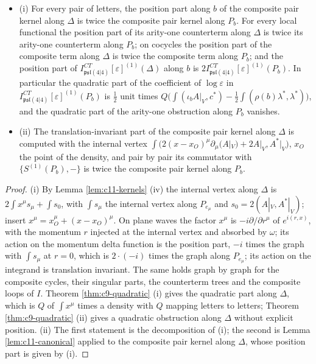 \begin{proposition}
\label{prop:c11-position}
\begin{itemize}
\item (i) For every pair of letters, the position part along $b$ of the composite pair kernel along $\Delta$ is twice the composite pair kernel along $P_b$. For every local functional the position part of its arity-one counterterm along $\Delta$ is twice its arity-one counterterm along $P_b$; on cocycles the position part of the composite term along $\Delta$ is twice the composite term along $P_b$; and the position part of $I^{CT}_{\mathfrak{psl}(4|4)}[\varepsilon]^{(1)}(\Delta)$ along $b$ is $2I^{CT}_{\mathfrak{psl}(4|4)}[\varepsilon]^{(1)}(P_b)$. In particular the quadratic part of the coefficient of $\log\varepsilon$ in $I^{CT}_{\mathfrak{psl}(4|4)}[\varepsilon]^{(1)}(P_b)$ is $\tfrac12$ unit times $Q\big(\int(\iota_bA|_V,c^*)-\tfrac12\int(\rho(b)\lambda^*,\lambda^*)\big)$, and the quadratic part of the arity-one obstruction along $P_b$ vanishes.
\item (ii) The translation-invariant part of the composite pair kernel along $\Delta$ is computed with the internal vertex $\int\big(2(x-x_O)^\mu\partial_\mu(A|_V)+2A|_V,A^*|_V\big)$, $x_O$ the point of the density, and pair by pair its commutator with $\{S^{(1)}(P_b),-\}$ is twice the composite pair kernel along $P_b$.
\end{itemize}
\end{proposition}

\begin{proof}
(i) By Lemma \ref{lem:c11-kernels} (iv) the internal vertex along $\Delta$ is $2\int x^\mu s_\mu+\int s_0$, with $\int s_\mu$ the internal vertex along $P_{e_\mu}$ and $s_0=2(A|_V,A^*|_V)$; insert $x^\mu=x_O^\mu+(x-x_O)^\mu$. On plane waves the factor $x^\mu$ is $-i\partial/\partial r^\mu$ of $e^{i(r,x)}$, with the momentum $r$ injected at the internal vertex and absorbed by $\omega$; its action on the momentum delta function is the position part, $-i$ times the graph with $\int s_\mu$ at $r=0$, which is $2\cdot(-i)$ times the graph along $P_{e_\mu}$; its action on the integrand is translation invariant. The same holds graph by graph for the composite cycles, their singular parts, the counterterm trees and the composite loops of $I$. Theorem \ref{thm:c9-quadratic} (i) gives the quadratic part along $\Delta$, which is $Q$ of $\int x^\mu$ times a density with $Q$ mapping letters to letters; Theorem \ref{thm:c9-quadratic} (ii) gives a quadratic obstruction along $\Delta$ without explicit position. (ii) The first statement is the decomposition of (i); the second is Lemma \ref{lem:c11-canonical} applied to the composite pair kernel along $\Delta$, whose position part is given by (i).
\end{proof}

